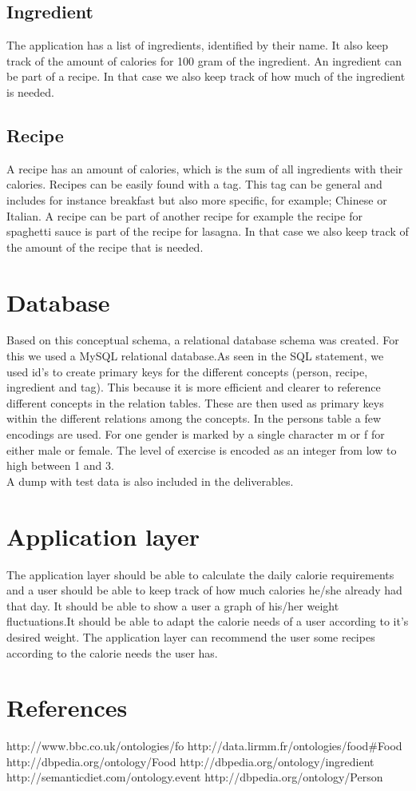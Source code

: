 \subsection{Ingredient}
The application has a list of ingredients, identified by their name. It also keep track of the amount of calories for 100 gram of the ingredient. An ingredient can be part of a recipe. In that case we also keep track of how much of the ingredient is needed.

\subsection{Recipe}
 A recipe has an amount of calories, which is the sum of all ingredients with their calories. Recipes can be easily found with a tag. This tag can be general and includes for instance breakfast but also more specific, for example; Chinese or Italian. A recipe can be part of another recipe for example the recipe for spaghetti sauce is part of the recipe for lasagna. In that case we also keep track of the amount of the recipe that is needed.   


\section{Database}
Based on this conceptual schema, a relational database schema was created. For this we used a MySQL relational database.As seen in the SQL statement, we used id's to create primary keys for the different concepts (person, recipe, ingredient and tag). This because it is more efficient and clearer to reference different concepts in the relation tables. These are then used as primary keys within the different relations among the concepts. In the persons table a few encodings are used. For one gender is marked by a single character m or f for either male or female. The level of exercise is encoded as an integer from low to high between 1 and 3.\\
A dump with test data is also included in the deliverables. 

\section{Application layer}
The application layer should be able to calculate the daily calorie requirements and a user should be able to keep track of how much calories he/she already had that day. It should be able to show a user a graph of his/her weight fluctuations.It should be able to adapt the calorie needs of a user according to it's desired weight. The application layer can recommend the user some recipes according to the calorie needs the user has.

\section*{References}
http://www.bbc.co.uk/ontologies/fo\newline
http://data.lirmm.fr/ontologies/food\#Food\newline
http://dbpedia.org/ontology/Food \newline
http://dbpedia.org/ontology/ingredient\newline
http://semanticdiet.com/ontology.event \newline
http://dbpedia.org/ontology/Person \newline


